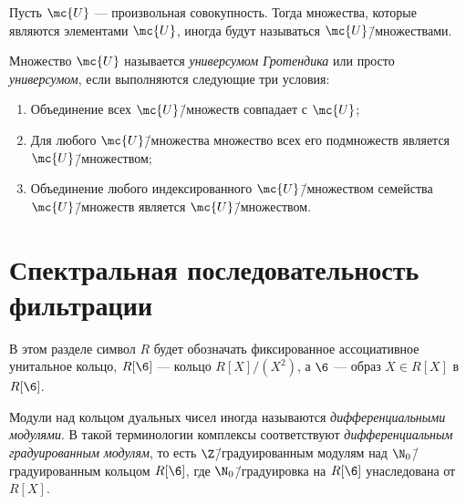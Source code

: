 \documentclass[
	extrafontsizes,
	11pt,
	hyphens,
]{memoir}
\begin{document}
\begin{convention}
Пусть \(\mc{U}\) --- произвольная совокупность.
Тогда множества, которые являются элементами \(\mc{U}\), иногда будут называться \(\mc{U}\)\=/множествами.
\end{convention}

\begin{definition}
Множество \(\mc{U}\) называется \emph{универсумом Гротендика} или просто \emph{универсумом}, если выполняются следующие три условия:
\begin{enumerate}[
	font=\upshape,
	label=\asbuk*),
	ref=\asbuk*,
	]

\item Объединение всех \(\mc{U}\)\=/множеств совпадает с \(\mc{U}\);

\item Для любого \(\mc{U}\)\=/множества множество всех его подмножеств является \(\mc{U}\)\=/множеством;

\item Объединение любого индексированного \(\mc{U}\)\=/множеством семейства \(\mc{U}\)\=/множеств является \(\mc{U}\)\=/множеством.

\end{enumerate}
\end{definition}


\section{Спектральная последовательность фильтрации}

\begin{convention}
В этом разделе символ \(R\) будет обозначать фиксированное ассоциативное унитальное кольцо, \(R[\6]\) --- кольцо \(R[X]/(X^2)\),
а \(\6\) --- образ \(X \in R[X]\) в \(R[\6]\).
\end{convention}

\begin{remark}
Модули над кольцом дуальных чисел иногда называются \emph{дифференциальными модулями}. В такой терминологии комплексы соответствуют \emph{дифференциальным градуированным модулям},
то есть \(\Z\)\=/градуированным модулям над \(\N_0\)\=/градуированным кольцом \(R[\6]\), где \(\N_0\)\=/градуировка на \(R[\6]\) унаследована от \(R[X]\).
\end{remark}
\end{document}
